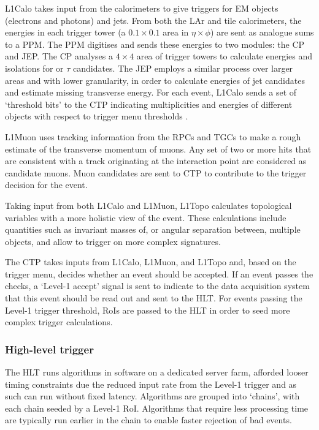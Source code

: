 L1Calo takes input from the calorimeters to give triggers for \ac{EM} objects
(electrons and photons) and jets. From both the \ac{LAr} and tile calorimeters,
the energies in each trigger tower (a $0.1\times0.1$ area in $\eta\times\phi$)
are sent as analogue sums to a \ac{PPM}. The \ac{PPM} digitises and sends these energies to two modules: the
\ac{CP} and \ac{JEP}. The \ac{CP} analyses a $4\times4$ area of trigger towers
to calculate energies and isolations for \egamma or $\tau$ candidates. The
\ac{JEP} employs a similar process over larger areas and with lower granularity,
in order to calculate energies of jet candidates and estimate missing transverse
energy. For each event, L1Calo sends a set of `threshold bits' to the \ac{CTP}
indicating multiplicities and energies of different objects with respect to
trigger menu thresholds \cite{Achenbach2008}.

L1Muon uses tracking information from the \acp{RPC} and \acp{TGC} to make a rough
estimate of the transverse momentum of muons. Any set of two or more hits that are
consistent with a track originating at the interaction point are considered as
candidate muons. Muon candidates are sent to \ac{CTP} to contribute to the
trigger decision for the event.

Taking input from both L1Calo and L1Muon, L1Topo calculates topological
variables with a more holistic view of the event. These calculations include
quantities such as invariant masses of, or angular separation between, multiple
objects, and allow to trigger on more complex signatures.

The \ac{CTP} takes inputs from L1Calo, L1Muon, and L1Topo and, based on the
trigger menu, decides whether an event should be accepted. If an event passes
the checks, a `Level-1 accept' signal is sent to indicate to the data
acquisition system that this event should be read out and sent to the \ac{HLT}.
For events passing the Level-1 trigger threshold, \acp{RoI} are passed to the
\ac{HLT} in order to seed more complex trigger calculations.

\subsubsection{High-level trigger}

The \ac{HLT} runs algorithms in software on a dedicated server farm, afforded
looser timing constraints due the reduced input rate from the Level-1 trigger
and as such can run without fixed latency.
Algorithms are grouped into `chains', with each chain seeded by a Level-1
\ac{RoI}. Algorithms that require less processing time are typically run earlier
in the chain to enable faster rejection of bad events.

